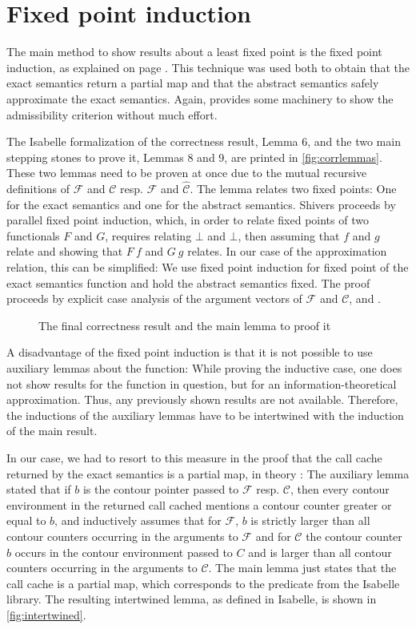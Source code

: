 \documentclass[a4paper,parskip=half,BCOR=8mm,DIV=calc,12pt]{scrbook}
\newcommand{\C}{\mathcal C}
\newcommand{\F}{\mathcal F}
\newcommand{\aC}{\widehat{\mathcal C}}
\newcommand{\aF}{\widehat{\mathcal F}}
\begin{document}
\section{Fixed point induction}

The main method to show results about a least fixed point is the fixed point induction, as explained on page \pageref{fixedpointinduction}. This technique was used both to obtain that the exact semantics return a partial map and that the abstract semantics safely approximate the exact semantics. Again,  provides some machinery to show the admissibility criterion without much effort.

The Isabelle formalization of the correctness result, Lemma 6, and the two main stepping stones to prove it, Lemmas 8 and 9, are printed in \vref{fig:corrlemmas}. These two lemmas need to be proven at once due to the mutual recursive definitions of $\F$ and $\C$ resp. $\aF$ and $\aC$. The lemma relates two fixed points: One for the exact semantics and one for the abstract semantics. Shivers proceeds by parallel fixed point induction, which, in order to relate fixed points of two functionals $F$ and $G$, requires relating $\bot$ and $\bot$, then assuming that $f$ and $g$ relate and showing that $F\ f$ and $G\ g$ relates. In our case of the approximation relation, this can be simplified: We use fixed point induction for fixed point of the exact semantics function and hold the abstract semantics fixed. The proof proceeds by explicit case analysis of the argument vectors of $\F$ and $\C$,  and .

\begin{figure}
\begin{framed}

\end{framed}
\caption{The final correctness result and the main lemma to proof it}
\label{fig:corrlemmas}
\end{figure}

A disadvantage of the fixed point induction is that it is not possible to use auxiliary lemmas about the function: While proving the inductive case, one does not show results for the function in question, but for an information-theoretical approximation. Thus, any previously shown results are not available. Therefore, the inductions of the auxiliary lemmas have to be intertwined with the induction of the main result.

In our case, we had to resort to this measure in the proof that the call cache returned by the exact semantics is a partial map, in theory : The auxiliary lemma stated that if $b$ is the contour pointer passed to $\F$ resp. $\C$, then every contour environment in the returned call cached mentions a contour counter greater or equal to $b$, and inductively assumes that for $\F$, $b$ is strictly larger than all contour counters occurring in the arguments to $\F$ and for $\C$ the contour counter $b$ occurs in the contour environment passed to $C$ and is larger than all contour counters occurring in the arguments to $\C$. The main lemma just states that the call cache is a partial map, which corresponds to the predicate  from the Isabelle library. The resulting intertwined lemma, as defined in Isabelle, is shown in \vref{fig:intertwined}.
\end{document}
